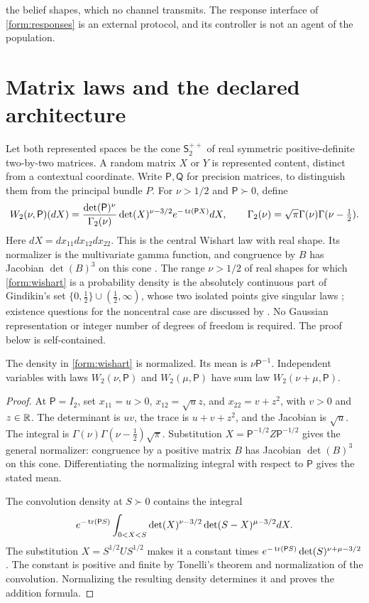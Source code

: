 the belief shapes, which no channel transmits. The response interface of \cref{form:responses} is an external protocol, and its controller is not an agent of the population.

\section{Matrix laws and the declared architecture}

Let both represented spaces be the cone $\mathsf S^{++}_2$ of real symmetric
positive-definite two-by-two matrices. A random matrix $X$ or $Y$ is represented
content, distinct from a contextual coordinate. Write $\mathsf P,\mathsf Q$ for
precision matrices, to distinguish them from the principal bundle $P$. For
$\nu>1/2$ and $\mathsf P\succ0$, define
\begin{equation}
 W_2(\nu,\mathsf P)(dX)
 =\frac{\det(\mathsf P)^\nu}{\Gamma_2(\nu)}
   \det(X)^{\nu-3/2}e^{-\operatorname{tr}(\mathsf P X)}dX,
 \qquad
 \Gamma_2(\nu)=\sqrt{\pi}\Gamma(\nu)\Gamma(\nu-\tfrac12).
 \label{form:wishart}
\end{equation}
Here $dX=dx_{11}dx_{12}dx_{22}$. This is the central Wishart law with real shape. Its normalizer is the multivariate gamma function, and congruence by $B$ has Jacobian $\det(B)^3$ on this cone \citep[Section 2.1 and Chapter 3]{Muirhead1982}. The range $\nu>1/2$ of real shapes for which \cref{form:wishart} is a probability density is the absolutely continuous part of Gindikin's set $\{0,\tfrac12\}\cup(\tfrac12,\infty)$, whose two isolated points give singular laws \citep{Gindikin1975}; existence questions for the noncentral case are discussed by \citet{LetacMassam2017}. No Gaussian representation or integer number of degrees of freedom is required. The proof below is self-contained.

The density in \cref{form:wishart} is normalized. Its mean is
$\nu\mathsf P^{-1}$. Independent variables with laws
$W_2(\nu,\mathsf P)$ and $W_2(\mu,\mathsf P)$ have sum law
$W_2(\nu+\mu,\mathsf P)$.

\begin{proof}
At $\mathsf P=I_2$, set $x_{11}=u>0$, $x_{12}=\sqrt u z$, and
$x_{22}=v+z^2$, with $v>0$ and $z\in\mathbb R$. The determinant is $uv$, the trace is
$u+v+z^2$, and the Jacobian is $\sqrt u$. The integral is
$\Gamma(\nu)\Gamma(\nu-\tfrac12)\sqrt\pi$. Substitution
$X=\mathsf P^{-1/2}Z\mathsf P^{-1/2}$ gives the general normalizer: congruence
by a positive matrix $B$ has Jacobian $\det(B)^3$ on this cone. Differentiating
the normalizing integral with respect to $\mathsf P$ gives the stated mean.

The convolution density at $S\succ0$ contains the integral
\begin{equation}
 e^{-\operatorname{tr}(\mathsf P S)}
 \int_{0<X<S}\det(X)^{\nu-3/2}
                 \det(S-X)^{\mu-3/2}dX.
\end{equation}
The substitution $X=S^{1/2}US^{1/2}$ makes it a constant times
$e^{-\operatorname{tr}(\mathsf P S)}\det(S)^{\nu+\mu-3/2}$. The constant is positive and
finite by Tonelli's theorem and normalization of the convolution. Normalizing
the resulting density determines it and proves the addition formula.
\end{proof}

